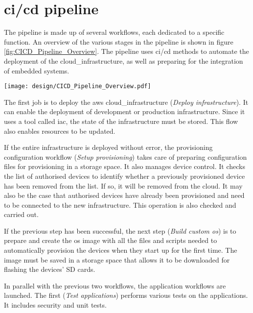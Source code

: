 \section{\texorpdfstring{\acrshort{ci}/\acrshort{cd}}{} pipeline}

The pipeline is made up of several workflows, each dedicated to a specific function. An overview of the various stages in the pipeline is shown in figure \ref{fig:CICD_Pipeline_Overview}. The pipeline uses \acrshort{ci}/\acrshort{cd} methods to automate the deployment of the \gls{cloud_infrastructure}, as well as preparing for the integration of embedded systems.
\begin{center}
    \begingroup
    \texttt{[image: design/CICD\_Pipeline\_Overview.pdf]}
    \label{fig:CICD_Pipeline_Overview}
    \endgroup
\end{center}
The first job is to deploy the \gls{aws} \gls{cloud_infrastructure} (\textit{Deploy infrastructure}). It can enable the deployment of development or production infrastructure. Since it uses a tool called \acrshort{iac}, the state of the infrastructure must be stored. This flow also enables resources to be updated.

If the entire infrastructure is deployed without error, the provisioning configuration workflow (\textit{Setup \gls{provisioning}}) takes care of preparing configuration files for \gls{provisioning} in a storage space. It also manages device control. It checks the list of authorised devices to identify whether a previously provisioned device has been removed from the list. If so, it will be removed from the \gls{cloud}. It may also be the case that authorised devices have already been provisioned and need to be connected to the new infrastructure. This operation is also checked and carried out.

If the previous step has been successful, the next step (\textit{Build custom \acrshort{os}}) is to prepare and create the \acrshort{os} image with all the files and scripts needed to automatically provision the devices when they start up for the first time. The image must be saved in a storage space that allows it to be downloaded for flashing the devices' SD cards.

In parallel with the previous two workflows, the application workflows are launched. The first (\textit{Test applications}) performs various tests on the applications. It includes security and unit tests.

